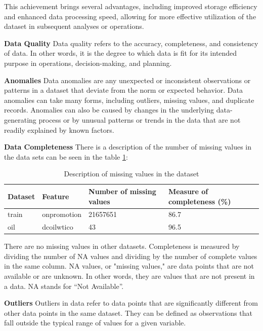 	This achievement brings several advantages, including improved storage efficiency and enhanced data processing speed, allowing for more effective utilization of the dataset in subsequent analyses or operations.
	
	\textbf{Data Quality}
	Data quality refers to the accuracy, completeness, and consistency of data. In other words, it is the degree to which data is fit for its intended purpose in operations, decision-making, and planning.
	
	\textbf{Anomalies}
	Data anomalies are any unexpected or inconsistent observations or patterns in a dataset that deviate from the norm or expected behavior. Data anomalies can take many forms, including outliers, missing values, and duplicate records. Anomalies can also be caused by changes in the underlying data-generating process or by unusual patterns or trends in the data that are not readily explained by known factors.
	
	\textbf{Data Completeness}
	There is a description of the number of missing values in the data sets can be seen in the table \ref{tab:DatasetMissing}:
	
	\begin{table}[h!]
		\centering
		\caption{Description of missing values in the dataset}
		\label{tab:DatasetMissing}
		\begin{tabular}{|l|l|p{3cm}|p{3cm}|}
			\hline
			\textbf{Dataset} & \textbf{Feature} & \textbf{Number of missing values} & \textbf{Measure of completeness (\%)} \\ \hline
			train & onpromotion & 21657651 & 86.7 \\ \hline
			oil & dcoilwtico & 43 & 96.5 \\ \hline
		\end{tabular}
	\end{table}
	
	There are no missing values in other datasets. Completeness is measured by dividing the number of NA values and dividing by the number of complete values in the same column. NA values, or "missing values," are data points that are not available or are unknown. In other words, they are values that are not present in a data. NA stands for “Not Available”.
	
	\textbf{Outliers}
	Outliers in data refer to data points that are significantly different from other data points in the same dataset. They can be defined as observations that fall outside the typical range of values for a given variable.
	
